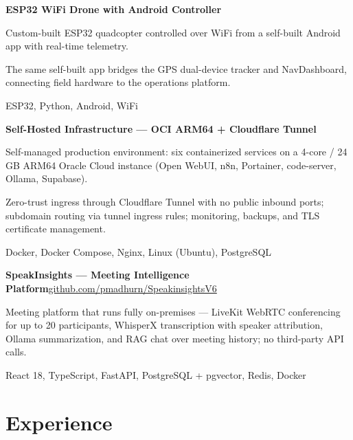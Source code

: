 \documentclass[10pt,a4paper]{article}
\newcommand{\entry}[2]{%
  \textbf{#1}\hfill{\small #2}\par\vspace{0.12em}}
\newcommand{\stack}[1]{{\small\color{subtle}#1}}
\begin{document}
\vspace{0.3em}
\entry{ESP32 WiFi Drone with Android Controller}{}
\begin{tight}
  \item Custom-built ESP32 quadcopter controlled over WiFi from a self-built Android app
        with real-time telemetry.
  \item The same self-built app bridges the GPS dual-device tracker and NavDashboard,
        connecting field hardware to the operations platform.
  \item \stack{ESP32, Python, Android, WiFi}
\end{tight}

\vspace{0.3em}
\entry{Self-Hosted Infrastructure — OCI ARM64 + Cloudflare Tunnel}{}
\begin{tight}
  \item Self-managed production environment: six containerized services on a 4-core /
        24\,GB ARM64 Oracle Cloud instance (Open WebUI, n8n, Portainer, code-server,
        Ollama, Supabase).
  \item Zero-trust ingress through Cloudflare Tunnel with no public inbound ports;
        subdomain routing via tunnel ingress rules; monitoring, backups, and TLS
        certificate management.
  \item \stack{Docker, Docker Compose, Nginx, Linux (Ubuntu), PostgreSQL}
\end{tight}

\vspace{0.3em}
\entry{SpeakInsights — Meeting Intelligence Platform}{\href{https://github.com/pmadhurn/SpeakinsightsV6}{github.com/pmadhurn/SpeakinsightsV6}}
\begin{tight}
  \item Meeting platform that runs fully on-premises — LiveKit WebRTC conferencing for up
        to 20 participants, WhisperX transcription with speaker attribution, Ollama
        summarization, and RAG chat over meeting history; no third-party API calls.
  \item \stack{React 18, TypeScript, FastAPI, PostgreSQL + pgvector, Redis, Docker}
\end{tight}

\section{Experience}
\end{document}
